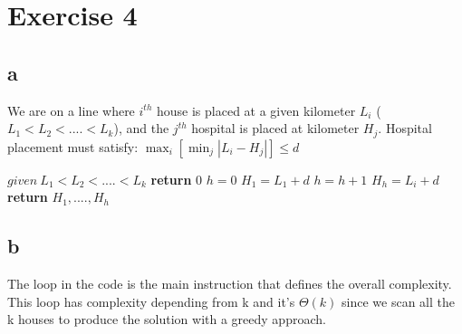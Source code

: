 \documentclass{article}
\begin{document}
\newpage
\section{Exercise 4}
\subsection{a}
We are on a line where $i^{th}$ house is placed at a given kilometer $L_{i}$ ($L_{1} < L_{2} <....< L_{k}$), and the $j^{th}$ hospital is placed at kilometer $H_{j}$. Hospital placement must satisfy: $\max_i[\min_j |L_{i}-H_{j}|] \le d $

\begin{algorithm}
\caption{}\label{alg:cap}
\begin{algorithmic}
\State $ given\ L_{1} < L_{2} <....< L_{k}$
\State \textbf{return} $0$
\EndIf
\State $h=0$
\State $H_{1}=L_{1}+d$
\State $h=h+1$
\State $H_{h}=L_{i}+d$
\EndIf
\EndFor
\State \textbf{return} $H_{1},....,H_{h}$
\end{algorithmic}
\end{algorithm}
\subsection{b}
The loop in the code is the main instruction that defines the overall complexity. This loop has complexity depending from k and it's $\Theta(k)$ since we scan all the k houses to produce the solution with a greedy approach.
\end{document}

